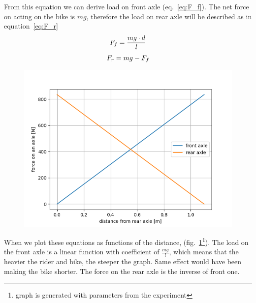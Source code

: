 \documentclass[12pt]{article}
\begin{document}
\newpage

From this equation we can derive load on front axle (eq.~\ref{eq:F_f}). The net force on acting 
on the bike is $mg$, therefore the load on rear axle will be described as in equation~\ref{eq:F_r}
\begin{equation}
\centering%
\label{eq:F_f}
F_f = \frac{mg \cdot d}{l}
\end{equation}
\begin{equation}
\centering%
\label{eq:F_r}
F_r = mg - F_f
\end{equation}

\begin{figure}[H]
\centering
\caption{}
\includegraphics[width=0.8\linewidth]{axles_static_graph}%
\label{fig:static_graph}
\end{figure}
When we plot these equations as functions of the distance, (fig.~\ref{fig:static_graph}\footnote[1]{graph is 
generated with parameters from the experiment}). The load on the front axle is a linear function with 
coefficient of $\frac{mg}{l}$, which means that the heavier the rider and bike, the steeper the graph.
Same effect would have been making the bike shorter. The force on the rear axle is the inverse of front one.
\end{document}
